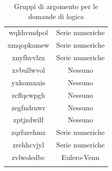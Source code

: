 \begin{longtable}{|c|c|}
wqkhvmdpol & Serie numeriche \\
xmqopkamew & Serie numeriche \\
xnyfhvvlzx & Serie numeriche \\
xvbullwvol & Nessuno \\
yxkoznnxis & Nessuno \\
zcflqcwpgh & Nessuno \\
zegfndrnwr & Nessuno \\
zptjzdwilf & Nessuno \\
zqrfurehmz & Serie numeriche \\
zrehhcvjyl & Serie numeriche \\
zvlwoledbc & Eulero-Venn \\
\hline
	
\caption{Gruppi di argomento per le domande di logica}\label{tab:Gruppi di argomento per le domande di logica}
\end{longtable}

